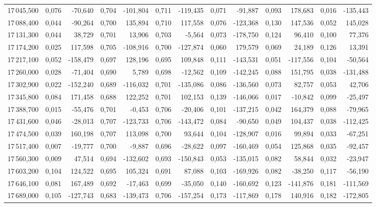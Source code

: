 \begin{longtable}{rrrrrrrrrrrrr}
17\,045,500 & 0,076 & -70,640 & 0,704 & -101,804 & 0,711 & -119,435 & 0,071 & -91,887 & 0,093 & 178,683 & 0,016 & -135,443\\
17\,088,400 & 0,044 & -90,264 & 0,700 & 135,894 & 0,710 & 117,558 & 0,076 & -123,368 & 0,130 & 147,536 & 0,052 & 145,028\\
17\,131,300 & 0,044 & 38,729 & 0,701 & 13,906 & 0,703 & -5,564 & 0,073 & -178,750 & 0,124 & 96,410 & 0,100 & 77,376\\
17\,174,200 & 0,025 & 117,598 & 0,705 & -108,916 & 0,700 & -127,874 & 0,060 & 179,579 & 0,069 & 24,189 & 0,126 & 13,391\\
17\,217,100 & 0,052 & -158,479 & 0,697 & 128,196 & 0,695 & 109,848 & 0,111 & -143,531 & 0,051 & -117,556 & 0,104 & -50,564\\
17\,260,000 & 0,028 & -71,404 & 0,690 & 5,789 & 0,698 & -12,562 & 0,109 & -142,245 & 0,088 & 151,795 & 0,038 & -131,488\\
17\,302,900 & 0,022 & -152,240 & 0,689 & -116,032 & 0,701 & -135,086 & 0,086 & -136,560 & 0,073 & 82,757 & 0,053 & 42,706\\
17\,345,800 & 0,084 & 171,458 & 0,688 & 122,252 & 0,701 & 102,153 & 0,139 & -146,066 & 0,017 & -10,842 & 0,099 & -25,497\\
17\,388,700 & 0,015 & -55,476 & 0,701 & -0,453 & 0,706 & -20,406 & 0,101 & -137,215 & 0,042 & 164,379 & 0,088 & -79,965\\
17\,431,600 & 0,046 & -28,013 & 0,707 & -123,733 & 0,706 & -143,472 & 0,084 & -90,650 & 0,049 & 104,437 & 0,038 & -112,425\\
17\,474,500 & 0,039 & 160,198 & 0,707 & 113,098 & 0,700 & 93,644 & 0,104 & -128,907 & 0,016 & 99,894 & 0,033 & -67,251\\
17\,517,400 & 0,007 & -19,777 & 0,700 & -9,887 & 0,696 & -28,622 & 0,097 & -160,469 & 0,054 & 125,868 & 0,035 & -92,457\\
17\,560,300 & 0,009 & 47,514 & 0,694 & -132,602 & 0,693 & -150,843 & 0,053 & -135,015 & 0,082 & 58,844 & 0,032 & -23,947\\
17\,603,200 & 0,104 & 124,522 & 0,695 & 105,324 & 0,691 & 87,088 & 0,103 & -169,926 & 0,082 & -38,250 & 0,117 & -56,190\\
17\,646,100 & 0,081 & 167,489 & 0,692 & -17,463 & 0,699 & -35,050 & 0,140 & -160,692 & 0,123 & -141,876 & 0,181 & -111,569\\
17\,689,000 & 0,105 & -127,743 & 0,683 & -139,473 & 0,706 & -157,254 & 0,173 & -117,869 & 0,178 & 140,916 & 0,182 & -172,805\\

\end{longtable}
